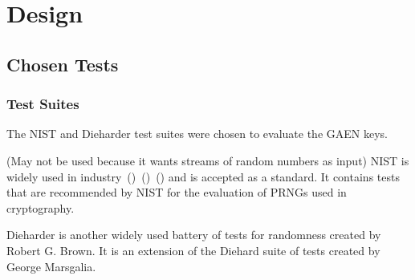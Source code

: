 \chapter{Design}
\section{Chosen Tests}

\subsection{Test Suites}

The NIST and Dieharder test suites were chosen to evaluate the GAEN keys. 

(May not be used because it wants streams of random numbers as input) NIST is widely used in industry~(\cite{9209663})~(\cite{9232553})~(\cite{6236554}) and is accepted as a standard. It contains tests that are recommended by NIST for the evaluation of PRNGs used in cryptography. \par

Dieharder is another widely used battery of tests for randomness created by Robert G. Brown. It is an extension of the Diehard suite of tests created by George Marsgalia.

